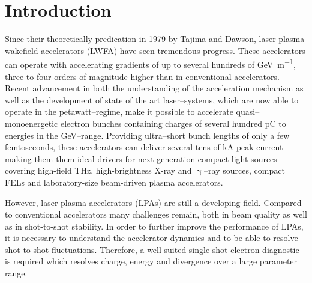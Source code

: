 \documentclass[%
preprint,
amsmath,
amssymb,
aip,
rsi, 
numerical,
floatfix,
]{revtex4-1}
\newcommand{\myCite}[1]{\textcolor{blue}{\cite{#1}}}
\begin{document}
\maketitle



\section{\label{Mot} Introduction}

Since their theoretically predication in 1979 by Tajima and Dawson\myCite{Tajima1979}, laser-plasma wakefield accelerators (LWFA) have seen tremendous progress. 
These accelerators can operate with accelerating gradients of up to several hundreds of \si{\giga\electronvolt\per\meter}, three to four orders of magnitude higher than in conventional accelerators.  
Recent advancement in both the understanding of the acceleration mechanism as well as the development of state of the art laser--systems, which are now able to operate in the petawatt--regime\myCite{Schramm2017, Gaul2010}, make it possible to accelerate quasi--monoenergetic\myCite{Geddes2004, Faure2004, Mangles2004} electron bunches containing charges of several hundred \si{\pico\coulomb} to energies in the \si{\giga\electronvolt}--range\myCite{Leemans2014, Schroeder2007, Wang2013}.
Providing ultra--short bunch lengths of only a few femtoseconds, these accelerators can deliver several tens of kA peak-current \myCite{Couperus2017, Li2017} making them them ideal drivers for next-generation compact light-sources covering high-field THz\myCite{Leemans2003,Green2016}, high-brightness X-ray\myCite{Jochmann2013,Powers2014} and $\upgamma$--ray\myCite{TaPhuoc2012,Sarri2014} sources, compact FELs\myCite{Schlenvoigt2007,Fuchs2009,Maier2012,Huang2012,Steiniger2014} and laboratory-size beam-driven plasma accelerators\myCite{MartinezDelaOssa2013,MartinezDeLaOssa2015}.

However, laser plasma accelerators (LPAs) are still a developing field. 
Compared to conventional accelerators many challenges remain, both in beam quality as well as in shot-to-shot stability.
In order to further improve the performance of LPAs, it is necessary to understand the accelerator dynamics and to be able to resolve shot-to-shot fluctuations. 
Therefore, a well suited single-shot electron diagnostic is required which resolves charge, energy and divergence over a large parameter range. 
\end{document}

